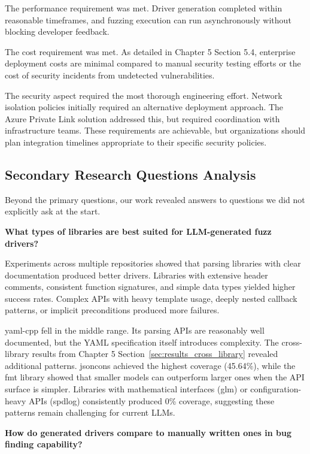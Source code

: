 The performance requirement was met. Driver generation completed within reasonable timeframes, and fuzzing execution can run asynchronously without blocking developer feedback.

The cost requirement was met. As detailed in Chapter 5 Section 5.4, enterprise deployment costs are minimal compared to manual security testing efforts or the cost of security incidents from undetected vulnerabilities.

The security aspect required the most thorough engineering effort. Network isolation policies initially required an alternative deployment approach. The Azure Private Link solution addressed this, but required coordination with infrastructure teams. These requirements are achievable, but organizations should plan integration timelines appropriate to their specific security policies.


\subsection{Secondary Research Questions Analysis}
\label{sec:discussion_rq_secondary}

Beyond the primary questions, our work revealed answers to questions we did not explicitly ask at the start.

\textbf{What types of libraries are best suited for LLM-generated fuzz drivers?}

Experiments across multiple repositories showed that parsing libraries with clear documentation produced better drivers. Libraries with extensive header comments, consistent function signatures, and simple data types yielded higher success rates. Complex APIs with heavy template usage, deeply nested callback patterns, or implicit preconditions produced more failures.

yaml-cpp fell in the middle range. Its parsing APIs are reasonably well documented, but the YAML specification itself introduces complexity. The cross-library results from Chapter 5 Section~\ref{sec:results_cross_library} revealed additional patterns. jsoncons achieved the highest coverage (45.64\%), while the fmt library showed that smaller models can outperform larger ones when the API surface is simpler. Libraries with mathematical interfaces (glm) or configuration-heavy APIs (spdlog) consistently produced 0\% coverage, suggesting these patterns remain challenging for current LLMs.

\textbf{How do generated drivers compare to manually written ones in bug finding capability?}

